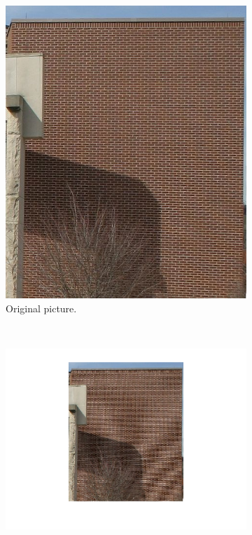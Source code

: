 \begin{figure}[h]
\centering
\begin{subfigure}{0.4\textwidth}
\includegraphics[width= \textwidth]{../Images/bricks.jpg}
\vspace{-30pt}
\caption{Original picture.}
\label{fig:bricksOriginal}
\end{subfigure}
~
\begin{subfigure}{0.4\textwidth}
\includegraphics[width= \textwidth]{../Images/bricksCompressed.png}

\end{subfigure}
\end{figure}
